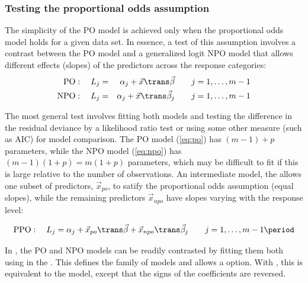 \documentclass[11pt]{book}
\begin{document}
\subsubsection{Testing the proportional odds assumption}
The simplicity of the PO model is achieved only when the proportional odds model holds
for a given data set.  In essence, a test of this assumption involves a contrast between
the PO model and a generalized logit NPO model that allows different effects (slopes)
of the predictors across the response categories:
\begin{eqnarray}
  \mathrm{PO}: \quad
    L_j &=& \alpha_j + \vec{x}\trans \vec{\beta} \quad\quad j=1, \dots , m-1 \label{eq:po} \\
  \mathrm{NPO}: \quad
    L_j &=& \alpha_j + \vec{x}\trans \vec{\beta}_j \quad\quad j=1, \dots , m-1 \label{eq:npo} 
\end{eqnarray}

The most general test involves fitting both models and testing the difference in the
residual deviance by a likelihood ratio test
or using some other measure (such as AIC) for model comparison. 
The PO model (\eqref{eq:po}) has $(m-1) + p$ parameters, while the NPO model
(\eqref{eq:npo}) has $(m-1) (1+p) = m(1+p)$ parameters, which may be difficult to
fit if this is large relative to the number of observations.
An intermediate model, the 
\citep{PetersonHarrell:90} allows one subset of predictors, $\vec{x}_{po}$,
to satify the proportional odds assumption (equal slopes), while the
remaining predictors $\vec{x}_{npo}$ have slopes varying with the response level:

\begin{equation}\label{eq:ppo}
   \mathrm{PPO}: \quad
  L_j = \alpha_j + \vec{x}_{po}\trans \vec{\beta} + \vec{x}_{npo}\trans \vec{\beta}_j \quad\quad j=1, \dots , m-1 \period
\end{equation}

In \R, the PO and NPO models can be readily contrasted by fitting them both using
 in the .  This defines the  
family of models and allows a  option.
With , this is equivalent to the  model,
except that the signs of the coefficients are reversed.
\end{document}

